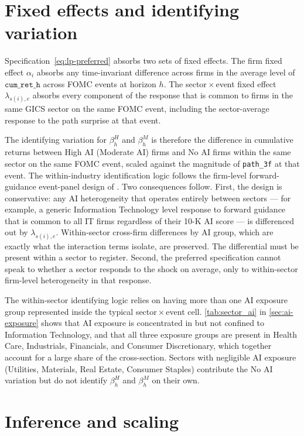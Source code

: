 \section{Fixed effects and identifying variation}
\label{sec:emp-fe}

Specification~\eqref{eq:lp-preferred} absorbs two sets of fixed effects. The firm fixed effect $\alpha_i$ absorbs any time-invariant difference across firms in the average level of $\mathtt{cum\_ret\_h}$ across FOMC events at horizon $h$. The sector\,$\times$\,event fixed effect $\lambda_{s(i),e}$ absorbs every component of the response that is common to firms in the same GICS sector on the same FOMC event, including the sector-average response to the path surprise at that event.

The identifying variation for $\beta_h^H$ and $\beta_h^M$ is therefore the difference in cumulative returns between High AI (Moderate AI) firms and No AI firms within the same sector on the same FOMC event, scaled against the magnitude of \texttt{path\_3f} at that event. The within-industry identification logic follows the firm-level forward-guidance event-panel design of \citet{gurkaynakKarasoyCanLee2022}. Two consequences follow. First, the design is conservative: any AI heterogeneity that operates entirely between sectors --- for example, a generic Information Technology level response to forward guidance that is common to all IT firms regardless of their 10-K AI score --- is differenced out by $\lambda_{s(i),e}$. Within-sector cross-firm differences by AI group, which are exactly what the interaction terms isolate, are preserved. The differential must be present within a sector to register. Second, the preferred specification cannot speak to whether a sector responds to the shock on average, only to within-sector firm-level heterogeneity in that response.

The within-sector identifying logic relies on having more than one AI exposure group represented inside the typical sector\,$\times$\,event cell. \cref{tab:sector_ai} in \cref{sec:ai-exposure} shows that AI exposure is concentrated in but not confined to Information Technology, and that all three exposure groups are present in Health Care, Industrials, Financials, and Consumer Discretionary, which together account for a large share of the cross-section. Sectors with negligible AI exposure (Utilities, Materials, Real Estate, Consumer Staples) contribute the No AI variation but do not identify $\beta_h^H$ and $\beta_h^M$ on their own.

\section{Inference and scaling}
\label{sec:emp-inference}

